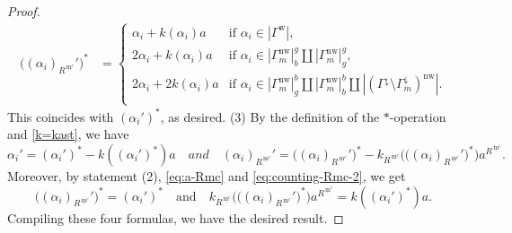 \documentclass[10pt,a4paper]{amsart}
\newcommand{\mc}{\, \underline{\mathrm{m}}^c}
\newcommand{\nw}{\mathrm{nw}}
\newcommand{\w}{\mathrm{w}}
\begin{document}
\begin{proof}
\begin{align*}
\big((\alpha_i)_{R^{\mc}}'\big)^*
&=
\begin{cases}
\alpha_i+k(\alpha_i)a & \text{if $\alpha_i\in |\Gamma^\w|$},\\
2\alpha_i+k(\alpha_i)a & \text{if $\alpha_i\in 
|\Gamma_m^\nw|_b^g\amalg |\Gamma_m^\nw|_g^g$},\\
2\alpha_i+2k(\alpha_i)a & \text{if $\alpha_i\in 
|\Gamma_m^\nw|_g^b\amalg |\Gamma_m^\nw|_b^b \amalg
|(\Gamma^{\downarrow}\setminus \Gamma_m^{\downarrow})^\nw|$}.\\
\end{cases}
\end{align*}
This coincides with $(\alpha_i')^\ast$, as desired.
\vskip 1mm
\noindent
(3) 
By the definition of the $\ast$-operation and \eqref{k=kast}, we have
\[\alpha_i'=(\alpha_i')^\ast-k((\alpha_i')^\ast)a\quad{and}\quad
(\alpha_i)_{R^{\mc}}'
=\big((\alpha_i)_{R^{\mc}}'\big)^\ast
-k_{R^{\mc}}\big(\big((\alpha_i)_{R^{\mc}}'\big)^\ast\big)a^{R^{\mc}}.\]
Moreover, by statement (2), \eqref{eq:a-Rmc} and 
\eqref{eq:counting-Rmc-2}, we get 
\[\big((\alpha_i)_{R^{\mc}}'\big)^\ast=(\alpha_i')^\ast\quad\text{and}\quad
k_{R^{\mc}}\big(\big((\alpha_i)_{R^{\mc}}'\big)^\ast\big)a^{R^{\mc}}
=k((\alpha_i')^\ast)a.\]
Compiling these four formulas, we have the desired result.
 \end{proof}
\end{document}
